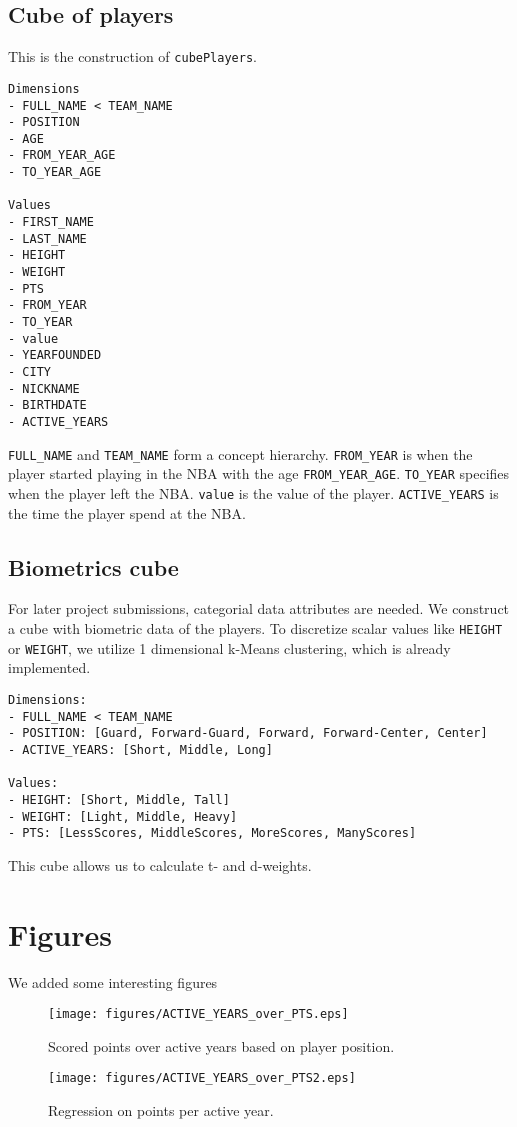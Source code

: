 \documentclass{article}
\begin{document}
\subsection{Cube of players}
This is the construction of \texttt{cubePlayers}.
\begin{lstlisting}
Dimensions
- FULL_NAME < TEAM_NAME
- POSITION
- AGE
- FROM_YEAR_AGE
- TO_YEAR_AGE

Values
- FIRST_NAME
- LAST_NAME
- HEIGHT
- WEIGHT
- PTS
- FROM_YEAR
- TO_YEAR
- value
- YEARFOUNDED
- CITY
- NICKNAME
- BIRTHDATE
- ACTIVE_YEARS
\end{lstlisting}
\texttt{FULL\_NAME} and \texttt{TEAM\_NAME} form a concept hierarchy.
\texttt{FROM\_YEAR} is when the player started playing in the NBA with the age \texttt{FROM\_YEAR\_AGE}.
\texttt{TO\_YEAR} specifies when the player left the NBA.
\texttt{value} is the value of the player.
\texttt{ACTIVE\_YEARS} is the time the player spend at the NBA.

\subsection{Biometrics cube}
For later project submissions, categorial data attributes are needed.
We construct a cube with biometric data of the players.
To discretize scalar values like \texttt{HEIGHT} or \texttt{WEIGHT}, we utilize 1 dimensional k-Means clustering, which is already implemented.
\begin{lstlisting}
Dimensions:
- FULL_NAME < TEAM_NAME
- POSITION: [Guard, Forward-Guard, Forward, Forward-Center, Center]
- ACTIVE_YEARS: [Short, Middle, Long]

Values:
- HEIGHT: [Short, Middle, Tall]
- WEIGHT: [Light, Middle, Heavy]
- PTS: [LessScores, MiddleScores, MoreScores, ManyScores]
\end{lstlisting}
This cube allows us to calculate t- and d-weights.

\section{Figures}
We added some interesting figures

\begin{figure}[h]
    \centering
    \texttt{[image: figures/ACTIVE\_YEARS\_over\_PTS.eps]}
    \caption{Scored points over active years based on player position.}
\end{figure}

\begin{figure}[h]
    \centering
    \texttt{[image: figures/ACTIVE\_YEARS\_over\_PTS2.eps]}
    \caption{Regression on points per active year.}
\end{figure}
\end{document}
